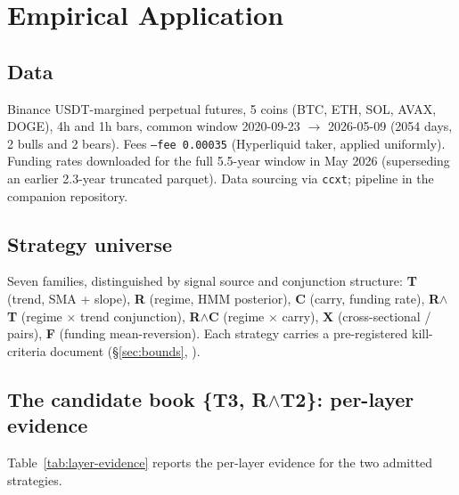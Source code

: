 \documentclass[11pt]{article}
\begin{document}
\section{Empirical Application}
\label{sec:empirical}

\subsection{Data}
Binance USDT-margined perpetual futures, 5 coins (BTC, ETH, SOL, AVAX, DOGE),
4h and 1h bars, common window 2020-09-23 $\to$ 2026-05-09 (2054 days, 2 bulls
and 2 bears). Fees \texttt{--fee 0.00035} (Hyperliquid taker, applied
uniformly). Funding rates downloaded for the full 5.5-year window in May 2026
(superseding an earlier 2.3-year truncated parquet). Data sourcing via
\texttt{ccxt}; pipeline in the companion repository.

\subsection{Strategy universe}

Seven families, distinguished by signal source and conjunction structure:
\textbf{T} (trend, SMA + slope), \textbf{R} (regime, HMM posterior),
\textbf{C} (carry, funding rate), \textbf{R$\wedge$T} (regime $\times$ trend
conjunction), \textbf{R$\wedge$C} (regime $\times$ carry), \textbf{X}
(cross-sectional / pairs), \textbf{F} (funding mean-reversion). Each
strategy carries a pre-registered kill-criteria document (\S\ref{sec:bounds},
\citep{decision_004, decision_005}).

\subsection{The candidate book \{T3, R$\wedge$T2\}: per-layer evidence}



Table~\ref{tab:layer-evidence} reports the per-layer evidence for the two
admitted strategies.
\end{document}
